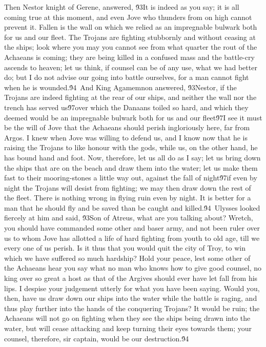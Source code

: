 {Then Nestor knight of Gerene, answered, \'93It is indeed as you say; it is all coming true at this moment, and even Jove who thunders from on high cannot prevent it. Fallen is the wall on which we relied as an impregnable bulwark both for us and our fleet. The Trojans are fighting stubbornly and without ceasing at the ships; look where you may you cannot see from what quarter the rout of the Achaeans is coming; they are being killed in a confused mass and the battle-cry ascends to heaven; let us think, if counsel can be of any use, what we had better do; but I do not advise our going into battle ourselves, for a man cannot fight when he is wounded.\'94\
And King Agamemnon answered, \'93Nestor, if the Trojans are indeed fighting at the rear of our ships, and neither the wall nor the trench has served us\'97over which the Danaans toiled so hard, and which they deemed would be an impregnable bulwark both for us and our fleet\'97I see it must be the will of Jove that the Achaeans should perish ingloriously here, far from Argos. I knew when Jove was willing to defend us, and I know now that he is raising the Trojans to like honour with the gods, while us, on the other hand, he has bound hand and foot. Now, therefore, let us all do as I say; let us bring down the ships that are on the beach and draw them into the water; let us make them fast to their mooring-stones a little way out, against the fall of night\'97if even by night the Trojans will desist from fighting; we may then draw down the rest of the fleet. There is nothing wrong in flying ruin even by night. It is better for a man that he should fly and be saved than be caught and killed.\'94\
Ulysses looked fiercely at him and said, \'93Son of Atreus, what are you talking about? Wretch, you should have commanded some other and baser army, and not been ruler over us to whom Jove has allotted a life of hard fighting from youth to old age, till we every one of us perish. Is it thus that you would quit the city of Troy, to win which we have suffered so much hardship? Hold your peace, lest some other of the Achaeans hear you say what no man who knows how to give good counsel, no king over so great a host as that of the Argives should ever have let fall from his lips. I despise your judgement utterly for what you have been saying. Would you, then, have us draw down our ships into the water while the battle is raging, and thus play further into the hands of the conquering Trojans? It would be ruin; the Achaeans will not go on fighting when they see the ships being drawn into the water, but will cease attacking and keep turning their eyes towards them; your counsel, therefore, sir captain, would be our destruction.\'94\
}
